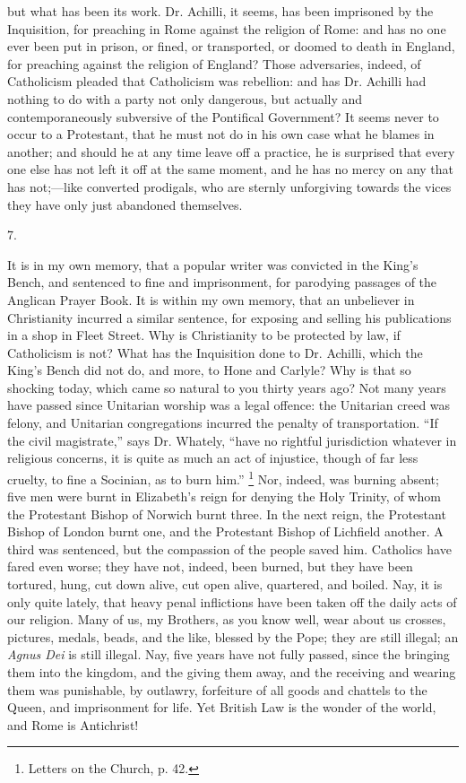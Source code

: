 but what has been its work. Dr. Achilli, it seems, has
been imprisoned by the Inquisition, for preaching in Rome
against the religion of Rome: and has no one ever been
put in prison, or fined, or transported, or doomed to
death in England, for preaching against the religion of
England? Those adversaries, indeed, of Catholicism
pleaded that Catholicism was rebellion: and has Dr.
Achilli had nothing to do with a party not only
dangerous, but actually and contemporaneously subversive
of the Pontifical Government? It seems never to occur to
a Protestant, that he must not do in his own case what he
blames in another; and should he at any time leave off a
practice, he is surprised that every one else has not
left it off at the same moment, and he has no mercy on
any that has not;—like converted prodigals, who are
sternly unforgiving towards the vices they have only just
abandoned themselves.

7.

It is in my own memory, that a popular writer was
convicted in the King's Bench, and sentenced to fine and
imprisonment, for parodying passages of the Anglican
Prayer Book. It is within my own memory, that an
unbeliever in Christianity incurred a similar sentence,
for exposing and selling his publications in a shop in
Fleet Street. Why is Christianity to be protected by law,
if Catholicism is not? What has the Inquisition done to
Dr. Achilli, which the King's Bench did not do, and more,
to Hone and Carlyle? Why is that so shocking today, which
came so natural to you thirty years ago? Not many years
have passed since Unitarian worship was a legal offence:
the Unitarian creed was felony, and Unitarian congregations incurred the penalty of transportation.
``If the civil magistrate,'' says Dr. Whately,
``have no rightful jurisdiction whatever in religious
concerns, it is quite as much an act of injustice, though
of far less cruelty, to fine a Socinian, as to burn
him.'' \footnote{Letters on the Church, p.
42.} Nor, indeed, was burning absent; five men were
burnt in Elizabeth's reign for denying the Holy Trinity,
of whom the Protestant Bishop of Norwich burnt three. In
the next reign, the Protestant Bishop of London burnt
one, and the Protestant Bishop of Lichfield another. A
third was sentenced, but the compassion of the people
saved him. Catholics have fared even worse; they have
not, indeed, been burned, but they have been tortured,
hung, cut down alive, cut open alive, quartered, and
boiled. Nay, it is only quite lately, that heavy penal
inflictions have been taken off the daily acts of our
religion. Many of us, my Brothers, as you know well, wear
about us crosses, pictures, medals, beads, and the like,
blessed by the Pope; they are still illegal; an \emph{Agnus
Dei} is still illegal. Nay, five years have not fully
passed, since the bringing them into the kingdom, and the
giving them away, and the receiving and wearing them was
punishable, by outlawry, forfeiture of all goods and
chattels to the Queen, and imprisonment for life. Yet
British Law is the wonder of the world, and Rome is
Antichrist!

